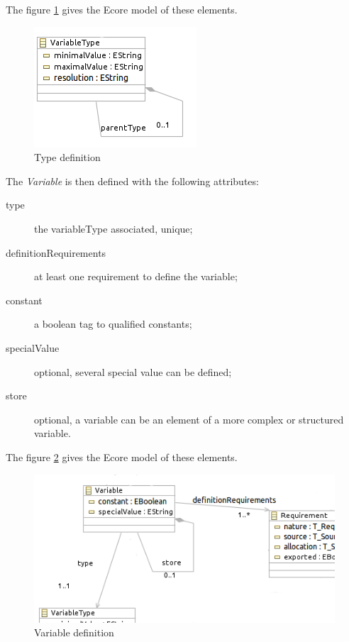 The figure \ref{fig:Type} gives the Ecore model of these elements.

\begin{figure}[ht]
  \centering
  \includegraphics{DataModel/Type3.png}
  \caption{Type definition}
  \label{fig:Type}
\end{figure}

The \textit{Variable} is then defined with the following attributes:
\begin{description}
\item[type] the variableType associated, unique;
\item[definitionRequirements] at least one requirement to  define the variable;
\item[constant] a boolean tag to qualified constants;
\item[specialValue] optional, several special value can be defined;
\item[store] optional, a variable can be an element of a more complex or structured variable.
\end{description}

The figure \ref{fig:variable} gives the Ecore model of these elements.


\begin{figure}[ht]
  \centering
  \includegraphics{DataModel/Variable3.png}
  \caption{Variable definition}
  \label{fig:variable}
\end{figure}



